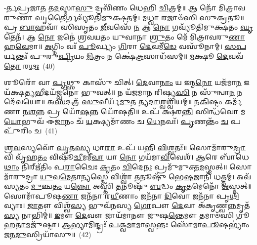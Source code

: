-𑌰𑍍𑌤𑌪𑍍𑌰𑌜𑌾\-\ul{𑌤} 𑌤\-\ul{𑌦}\-𑌸𑍍𑌮𑌾\-\ul{𑌸𑍁} 𑌦𑍍𑌰𑌵𑌿᳴𑌣𑌂 𑌧𑍇𑌹𑌿 \ul{𑌚𑌿}\-𑌤𑍍𑌰𑌮𑍍॥ 𑌆 𑌨𑍋᳴ 𑌮𑌿𑌤𑍍𑌰𑌾𑌵𑌰𑍁𑌣𑌾 \ul{𑌘𑍃}\-𑌤𑍈𑌰𑍍𑌗𑌵𑍍𑌯𑍂᳴𑌤𑌿𑌮𑍁𑌕𑍍𑌷𑌤𑌮𑍍। 𑌮\-\ul{𑌧𑍍𑌵𑌾} 𑌰𑌜𑌾𑍞᳴𑌸𑌿 𑌸𑍁𑌕𑍍𑌰𑌤𑍂॥ 𑌪𑍍𑌰 \ul{𑌬𑌾}\-𑌹𑌵𑌾᳴ 𑌸𑌿𑌸𑍃𑌤𑌂 \ul{𑌜𑍀}\-𑌵𑌸𑍇᳴ \ul{𑌨} 𑌆 \ul{𑌨𑍋} 𑌗𑌵𑍍𑌯𑍂᳴𑌤𑌿𑌮𑍁𑌕𑍍𑌷𑌤𑌂 \ul{𑌘𑍃}\-𑌤𑍇𑌨᳴। 𑌆 \ul{𑌨𑍋} 𑌜𑌨𑍇॑ 𑌶𑍍𑌰𑌵𑌯𑌤𑌂 𑌯𑍁𑌵𑌾𑌨𑌾 \ul{𑌶𑍍𑌰𑍁}\-𑌤𑌂 𑌮𑍇᳴ 𑌮𑌿𑌤𑍍𑌰𑌾𑌵𑌰𑍁\-\ul{𑌣𑌾} 𑌹\-\ul{𑌵𑍇}\-𑌮𑌾॥ \ul{𑌅}\-𑌗𑍍𑌨𑌿𑌂 𑌵𑌃᳴ \ul{𑌪𑍂}\-𑌰𑍍𑌵𑍍𑌯𑌂 \ul{𑌗𑌿}\-𑌰𑌾 \ul{𑌦𑍇}\-𑌵𑌮𑍀᳴\-\ul{𑌡𑍇} 𑌵𑌸𑍂᳴𑌨𑌾𑌮𑍍। \ul{𑌸}\-\-\ul{𑌪}\-𑌰𑍍𑌯𑌨𑍍𑌤𑌃᳴ 𑌪𑍁𑌰𑍁\-\ul{𑌪𑍍𑌰𑌿}\-𑌯𑌂 \ul{𑌮𑌿}\-𑌤𑍍𑌰𑌂 𑌨 𑌕𑍍𑌷𑍇॑\-\ul{𑌤𑍍𑌰}\-𑌸𑌾𑌧᳴𑌸𑌮𑍍॥ \ul{𑌮}\-𑌕𑍍𑌷𑍂 \ul{𑌦𑍇}\-𑌵𑌵᳴\-\ul{𑌤𑍋} 𑌰\-\ul{𑌥𑌃}\-~(40)

𑌶𑍂𑌰𑍋᳴ 𑌵𑌾 \ul{𑌪𑍃}\-𑌥𑍍𑌸𑍁 𑌕𑌾𑌸𑍁᳴ 𑌚𑌿𑌤𑍍। \ul{𑌦𑍇}\-𑌵𑌾\-\ul{𑌨𑌾𑌂} 𑌯 𑌇𑌨𑍍𑌮\-\ul{𑌨𑍋} 𑌯𑌜᳴𑌮𑌾\-\ul{𑌨} 𑌇𑌯᳴𑌕𑍍𑌷\-\ul{𑌤𑍍𑌯}\-𑌭𑍀𑌦𑌯᳴𑌜𑍍𑌵𑌨𑍋 𑌭𑍁𑌵𑌤𑍍॥ 𑌨 𑌯᳴𑌜𑌮𑌾𑌨 𑌰𑌿𑌷𑍍𑌯\-\ul{𑌸𑌿} 𑌨 𑌸𑍁᳴𑌨𑍍𑌵𑌾\-\ul{𑌨} 𑌨 𑌦𑍇᳴𑌵𑌯𑍋॥ 𑌅\-\ul{𑌸}\-𑌦𑌤𑍍𑌰᳴ \ul{𑌸𑍁}\-𑌵𑍀𑌰𑍍𑌯᳴\-\ul{𑌮𑍁}\-𑌤 𑌤𑍍𑌯\-\ul{𑌦𑌾}\-𑌶𑍍𑌵𑌶𑍍𑌵𑌿᳴𑌯𑌮𑍍॥ 𑌨\-\ul{𑌕𑌿}\-𑌷𑍍𑌟𑌂 𑌕𑌰𑍍𑌮᳴𑌣𑌾 𑌨\-\ul{𑌶}\-𑌨𑍍𑌨 𑌪𑍍𑌰 𑌯𑍋᳴\-\ul{𑌷}\-𑌨𑍍𑌨 𑌯𑍋᳴𑌷𑌤𑌿॥ 𑌉𑌪᳴ 𑌕𑍍𑌷𑌰\-\ul{𑌨𑍍𑌤𑌿} 𑌸𑌿𑌨𑍍𑌧᳴𑌵𑍋 𑌮\-\ul{𑌯𑍋}\-𑌭𑍁𑌵᳴ 𑌈\-\ul{𑌜𑌾}\-𑌨𑌂 𑌚᳴ \ul{𑌯}\-𑌕𑍍𑌷𑍍𑌯𑌮𑌾᳴𑌣𑌂 𑌚 \ul{𑌧𑍇}\-𑌨𑌵𑌃᳴। \ul{𑌪𑍃}\-𑌣𑌨𑍍𑌤𑌂᳴ \ul{𑌚} 𑌪𑌪𑍁᳴𑌰𑌿𑌂 𑌚~(41)

𑌶𑍍𑌰\-\ul{𑌵}\-𑌸𑍍𑌯𑌵𑍋᳴ \ul{𑌘𑍃}\-𑌤\-\ul{𑌸𑍍𑌯} 𑌧𑌾\-\ul{𑌰𑌾} 𑌉𑌪᳴ 𑌯𑌨𑍍𑌤𑌿 \ul{𑌵𑌿}\-𑌶𑍍𑌵𑌤𑌃᳴॥ 𑌸𑍋𑌮𑌾᳴𑌰𑍁\-\ul{𑌦𑍍𑌰𑌾} 𑌵𑌿 𑌵𑍃᳴𑌹\-\ul{𑌤𑌂} 𑌵𑌿𑌷𑍂᳴\-\ul{𑌚𑍀}\-𑌮𑌮𑍀᳴\-\ul{𑌵𑌾} 𑌯𑌾 \ul{𑌨𑍋} 𑌗𑌯᳴𑌮𑌾\-\ul{𑌵𑌿}\-𑌵𑍇𑌶᳴। \ul{𑌆}\-𑌰𑍇 𑌬𑌾᳴𑌧𑍇\-\ul{𑌥𑌾𑌂} 𑌨𑌿𑌰𑍍\mbox{}𑌋᳴𑌤𑌿𑌂 𑌪\-\ul{𑌰𑌾}\-𑌚𑍈𑌃 \ul{𑌕𑍃}\-𑌤𑌂 \ul{𑌚𑌿}\-𑌦𑍇\-\ul{𑌨𑌃} 𑌪𑍍𑌰𑌮𑍁᳴𑌮𑍁𑌕𑍍𑌤\-\ul{𑌮}\-𑌸𑍍𑌮𑌤𑍍॥ 𑌸𑍋𑌮𑌾᳴𑌰𑍁𑌦𑍍𑌰𑌾 \ul{𑌯𑍁}\-𑌵\-\ul{𑌮𑍇}\-𑌤𑌾\-\ul{𑌨𑍍𑌯}\-𑌸𑍍𑌮𑍇 𑌵𑌿𑌶𑍍𑌵𑌾᳴ \ul{𑌤}\-𑌨𑍂𑌷𑍁᳴ 𑌭𑍇\-\ul{𑌷}\-𑌜𑌾𑌨𑌿᳴ 𑌧𑌤𑍍𑌤𑌮𑍍। 𑌅𑌵᳴ 𑌸𑍍𑌯𑌤𑌂 \ul{𑌮𑍁}\-𑌞𑍍𑌚\-\ul{𑌤𑌂} 𑌯\-\ul{𑌨𑍍𑌨𑍋} 𑌅𑌸𑍍𑌤𑌿᳴ \ul{𑌤}\-𑌨𑍂𑌷𑍁᳴ \ul{𑌬}\-𑌦𑍍𑌧𑌂 \ul{𑌕𑍃}\-𑌤𑌮𑍇𑌨𑍋᳴ \ul{𑌅}\-𑌸𑍍𑌮𑌤𑍍॥ 𑌸𑍋𑌮𑌾᳴𑌪𑍂𑌷\-\ul{𑌣𑌾} 𑌜𑌨᳴𑌨𑌾 𑌰\-\ul{𑌯𑍀}\-𑌣𑌾𑌂 𑌜𑌨᳴𑌨𑌾 \ul{𑌦𑌿}\-𑌵𑍋 𑌜𑌨᳴𑌨𑌾 𑌪𑍃\-\ul{𑌥𑌿}\-𑌵𑍍𑌯𑌾𑌃। \ul{𑌜𑌾}\-𑌤𑍗 𑌵𑌿𑌶𑍍𑌵᳴\-\ul{𑌸𑍍𑌯} 𑌭𑍁𑌵᳴𑌨𑌸𑍍𑌯 \ul{𑌗𑍋}\-𑌪𑍗 \ul{𑌦𑍇}\-𑌵𑌾 𑌅᳴𑌕𑍃𑌣𑍍𑌵\-\ul{𑌨𑍍𑌨}\-𑌮𑍃𑌤᳴\-\ul{𑌸𑍍𑌯} 𑌨𑌾𑌭𑌿𑌮𑍍॑॥ \ul{𑌇}\-𑌮𑍗 \ul{𑌦𑍇}\-𑌵𑍗 𑌜𑌾𑌯᳴𑌮𑌾𑌨𑍗 𑌜𑍁𑌷\-\ul{𑌨𑍍𑌤𑍇}\-𑌮𑍗 𑌤𑌮𑌾𑍞᳴𑌸𑌿 𑌗𑍂𑌹\-\ul{𑌤𑌾}\-𑌮𑌜𑍁᳴𑌷𑍍𑌟𑌾। \ul{𑌆}\-𑌭𑍍𑌯𑌾𑌮𑌿𑌨𑍍𑌦𑍍𑌰𑌃᳴ \ul{𑌪}\-𑌕𑍍𑌵\-\ul{𑌮𑌾}\-𑌮𑌾\-\ul{𑌸𑍍𑌵}\-𑌨𑍍𑌤𑌃 𑌸𑍋᳴𑌮𑌾\-\ul{𑌪𑍂}\-𑌷\-𑌭𑍍𑌯𑌾𑌂॑ 𑌜𑌨\-\ul{𑌦𑍁}\-𑌸𑍍𑌰𑌿𑌯𑌾᳴𑌸𑍁॥~(42)

{\anuvakamend[{\-\ul{𑌬𑍃}\-\-\ul{𑌹}\-𑌤𑌃 𑌶𑌵᳴\-\ul{𑌸𑌾} 𑌰\-\ul{𑌥𑌃} 𑌪𑌪𑍁᳴𑌰𑌿𑌂 𑌚 \ul{𑌦𑌿}\-𑌵𑍋 𑌜𑌨᳴\-\ul{𑌨𑌾} 𑌪𑌞𑍍𑌚᳴𑌵𑌿𑍞𑌶𑌤𑌿𑌶𑍍𑌚}]}%


